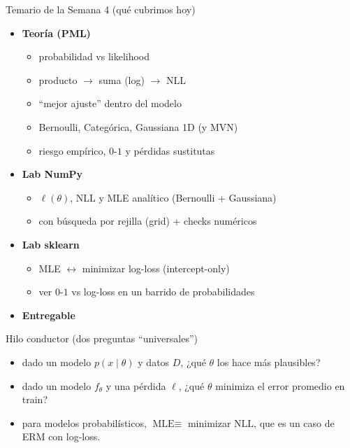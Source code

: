 \begin{frame}{Temario de la Semana 4 (qué cubrimos hoy)}
\begin{itemize}
  \item \textbf{Teoría (PML)}
  \begin{itemize}\small
    \item {} probabilidad vs likelihood \hfill {}
    \item {} producto \(\rightarrow\) suma (log) \(\rightarrow\) NLL \hfill {}
    \item {} “mejor ajuste” dentro del modelo \hfill {}
    \item {} Bernoulli, Categórica, Gaussiana 1D (y MVN) \hfill {}
    \item {} riesgo empírico, \(0\text{-}1\) y pérdidas sustitutas \hfill {}
  \end{itemize}
  \item \textbf{Lab NumPy}
  \begin{itemize}\small
    \item {} \(\ell(\theta)\), NLL y MLE analítico (Bernoulli + Gaussiana)
    \item {} con búsqueda por rejilla (grid) + checks numéricos
  \end{itemize}
  \item \textbf{Lab sklearn}
  \begin{itemize}\small
    \item {} MLE \(\leftrightarrow\) minimizar log-loss (intercept-only)
    \item {} ver \(0\text{-}1\) vs log-loss en un barrido de probabilidades
  \end{itemize}
  \item \textbf{Entregable}
\end{itemize}
\end{frame}

\begin{frame}{Hilo conductor (dos preguntas “universales”)}
\begin{itemize}
  \item {} dado un modelo \(p(x\mid\theta)\) y datos \(D\), ¿qué \(\theta\) los hace más plausibles? \hfill {}
  \item {} dado un modelo \(f_\theta\) y una pérdida \(\ell\), ¿qué \(\theta\) minimiza el error promedio en train? \hfill {}
  \item {} para modelos probabilísticos, \(\text{MLE} \equiv\) minimizar \(\text{NLL}\), que es un caso de ERM con log-loss.
\end{itemize}
\end{frame}

